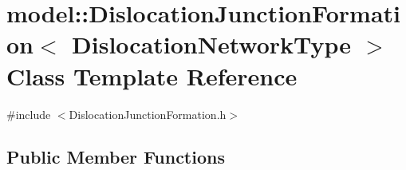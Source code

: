 \hypertarget{classmodel_1_1_dislocation_junction_formation}{}\section{model\+:\+:Dislocation\+Junction\+Formation$<$ Dislocation\+Network\+Type $>$ Class Template Reference}
\label{classmodel_1_1_dislocation_junction_formation}


{\ttfamily \#include $<$Dislocation\+Junction\+Formation.\+h$>$}

\subsection*{Public Member Functions}
